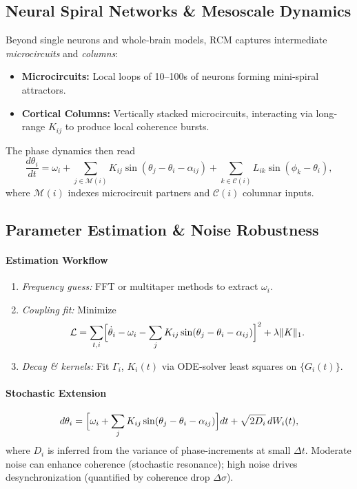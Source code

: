 \subsection{Neural Spiral Networks \& Mesoscale Dynamics}
Beyond single neurons and whole‐brain models, RCM captures intermediate \emph{microcircuits} and \emph{columns}:
\begin{itemize}
  \item \textbf{Microcircuits:} Local loops of 10–100s of neurons forming mini‐spiral attractors.
  \item \textbf{Cortical Columns:} Vertically stacked microcircuits, interacting via long‐range $K_{ij}$ to produce local coherence bursts.
\end{itemize}
The phase dynamics then read
\[
  \frac{d\theta_i}{dt}
    = \omega_i
    + \sum_{j\in \mathcal{M}(i)} K_{ij}\sin(\theta_j-\theta_i-\alpha_{ij})
    + \sum_{k\in \mathcal{C}(i)} L_{ik}\sin(\phi_k-\theta_i),
\]
where $\mathcal{M}(i)$ indexes microcircuit partners and $\mathcal{C}(i)$ columnar inputs.

\subsection{Parameter Estimation \& Noise Robustness}
\paragraph{Estimation Workflow}
\begin{enumerate}
  \item \emph{Frequency guess:} FFT or multitaper methods to extract $\omega_i$.
  \item \emph{Coupling fit:} Minimize
    \[
      \mathcal{L} = \sum_{t,i} \Bigl[\dot\theta_i - \omega_i
      - \sum_j K_{ij}\sin(\theta_j-\theta_i-\alpha_{ij})\Bigr]^2
      + \lambda\|K\|_1.
    \]
  \item \emph{Decay \& kernels:} Fit $\Gamma_i$, $K_i(t)$ via ODE‐solver least squares on $\{G_i(t)\}$.
\end{enumerate}

\paragraph{Stochastic Extension}
\[
  d\theta_i = \Bigl[\omega_i + \sum_j K_{ij}\sin(\theta_j-\theta_i-\alpha_{ij})\Bigr]dt
              + \sqrt{2D_i}\,dW_i(t),
\]
where $D_i$ is inferred from the variance of phase‐increments at small $\Delta t$.
Moderate noise can enhance coherence (stochastic resonance); high noise drives desynchronization (quantified by coherence drop $\Delta\sigma$).

